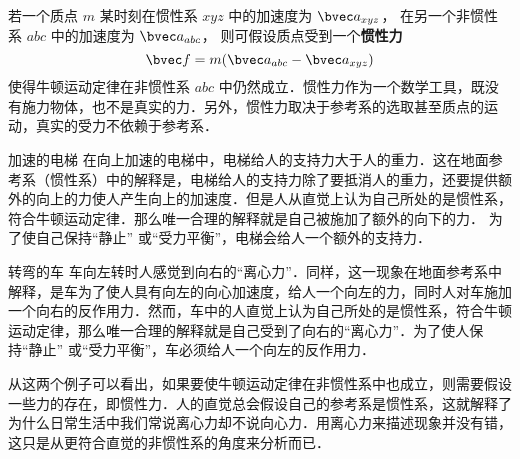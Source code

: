 

若一个质点 $m$ 某时刻在惯性系 $xyz$ 中的加速度为 $\bvec a_{xyz}$， 在另一个非惯性系 $abc$ 中的加速度为 $\bvec a_{abc}$， 则可假设质点受到一个\textbf{惯性力}
\begin{equation}\label{Iner_eq1}
\bvec f = m( \bvec a_{abc} - \bvec a_{xyz} )
\end{equation}
使得牛顿运动定律在非惯性系 $abc$ 中仍然成立．惯性力作为一个数学工具，既没有施力物体，也不是真实的力．另外，惯性力取决于参考系的选取甚至质点的运动，真实的受力不依赖于参考系．

\begin{example}{加速的电梯}\label{Iner_ex1}
在向上加速的电梯中，电梯给人的支持力大于人的重力．这在地面参考系（惯性系）中的解释是，电梯给人的支持力除了要抵消人的重力，还要提供额外的向上的力使人产生向上的加速度．但是人从直觉上认为自己所处的是惯性系，符合牛顿运动定律．那么唯一合理的解释就是自己被施加了额外的向下的力． 为了使自己保持“静止” 或“受力平衡”，电梯会给人一个额外的支持力．
\end{example}

\begin{example}{转弯的车}
车向左转时人感觉到向右的“离心力”．同样，这一现象在地面参考系中解释，是车为了使人具有向左的向心加速度，给人一个向左的力，同时人对车施加一个向右的反作用力．然而，车中的人直觉上认为自己所处的是惯性系，符合牛顿运动定律，那么唯一合理的解释就是自己受到了向右的“离心力”．为了使人保持“静止” 或“受力平衡”，车必须给人一个向左的反作用力．
\end{example}

从这两个例子可以看出，如果要使牛顿运动定律在非惯性系中也成立，则需要假设一些力的存在，即惯性力．人的直觉总会假设自己的参考系是惯性系，这就解释了为什么日常生活中我们常说离心力却不说向心力．用离心力来描述现象并没有错，这只是从更符合直觉的非惯性系的角度来分析而已．

